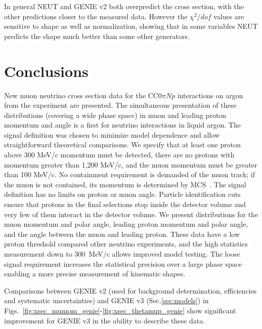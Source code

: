 \documentclass[%
twocolumn,
 amsmath,amssymb,
 aps,
prd,
superscriptaddress,showpacs]{revtex4-2}
\begin{document}
In general NEUT and GENIE v2 both overpredict the cross section, with the other predictions closer to the measured data.
However the $\chi^2/dof$ values are sensitive to shape as well as normalization, showing that in some variables NEUT predicts the shape much better than some other generators.

\section{Conclusions}

New muon neutrino cross section data for the CC$0\pi Np$ %
interactions on argon from the \mub  experiment are presented.
The simultaneous presentation of these distributions (covering a wide phase space) in muon and leading proton momentum and angle is a first for neutrino interactions in liquid argon.
The signal definition was chosen to minimize model dependence and allow straightforward theoretical comparisons.
We specify that at least one proton above 300 MeV/c momentum must be detected, there are no protons with momentum greater than 1,200 MeV/c, and the muon momentum must be greater than 100 MeV/c.
No containment requirement is demanded of the muon track; if the muon is not contained, its momentum is determined by MCS~\cite{Abratenko:2017nkiMCS}.
The signal definition has no limits on proton or muon angle.
Particle identification cuts ensure that protons in the final selections stop inside the detector volume and very few of them interact in the detector volume.
We present distributions for the muon momentum and polar angle, leading proton momentum and polar angle, and the angle between the muon and leading proton.
These data have a low proton threshold compared other neutrino experiments, and the high statistics measurement down to 300~MeV/c allows improved model testing.
The loose signal requirement increases the statistical precision over a large phase space enabling a more precise measurement of kinematic shapes.

Comparisons between GENIE v2 (used for background determination, efficiencies and systematic uncertainties) and GENIE v3 (Sec.\ref{sec:models}) in Figs.~\ref{fig:xsec_mumom_genie}-\ref{fig:xsec_thetamup_genie} show significant improvement for GENIE v3 in the ability to describe these data.
\end{document}
